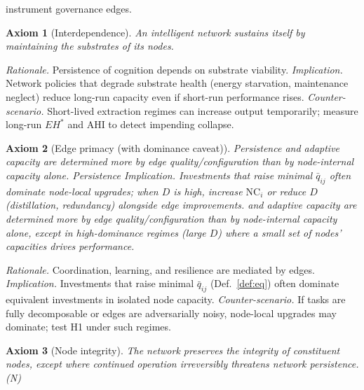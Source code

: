 \documentclass[12pt]{article}
\newtheorem{axiom}{Axiom}
\begin{document}
instrument governance edges. \n\label{sec:axioms} \begin{axiom}[Interdependence] An intelligent network sustains itself by maintaining the substrates of its nodes. \end{axiom} \emph{Rationale.} Persistence of cognition depends on substrate viability. \emph{Implication.} Network policies that degrade substrate health (energy starvation, maintenance neglect) reduce long-run capacity even if short-run performance rises. \emph{Counter-scenario.} Short-lived extraction regimes can increase output temporarily; measure long-run $EH^{\ast}$ and AHI to detect impending collapse. \begin{axiom}[Edge primacy (with dominance caveat)] Persistence and adaptive capacity are determined more by edge quality/configuration than by node-internal capacity alone. Persistence \emph{Implication.} Investments that raise minimal $\bar q_{ij}$ often dominate node-local upgrades; when $D$ is high, increase $\mathrm{NC}_i$ or reduce $D$ (distillation, redundancy) alongside edge improvements. and adaptive capacity are determined more by edge quality/configuration than by node-internal capacity alone, \emph{except} in high-dominance regimes (large $D$) where a small set of nodes' capacities drives performance. \end{axiom} \emph{Rationale.} Coordination, learning, and resilience are mediated by edges. \emph{Implication.} Investments that raise minimal $\bar{q}_{ij}$ (Def.~\ref{def:eq}) often dominate equivalent investments in isolated node capacity. \emph{Counter-scenario.} If tasks are fully decomposable or edges are adversarially noisy, node-local upgrades may dominate; test H1 under such regimes. \begin{axiom}[Node integrity] The network preserves the integrity of constituent nodes, except where continued operation irreversibly threatens network persistence. (N) 

\end{axiom}
\end{document}
